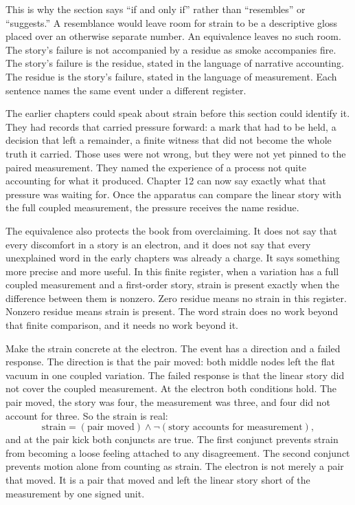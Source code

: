 This is why the section says ``if and only if'' rather than ``resembles'' or
``suggests.'' A resemblance would leave room for strain to be a descriptive
gloss placed over an otherwise separate number. An equivalence leaves no such
room. The story's failure is not accompanied by a residue as smoke accompanies
fire. The story's failure is the residue, stated in the language of narrative
accounting. The residue is the story's failure, stated in the language of
measurement. Each sentence names the same event under a different register.

The earlier chapters could speak about strain before this section could identify
it. They had records that carried pressure forward: a mark that had to be held,
a decision that left a remainder, a finite witness that did not become the whole
truth it carried. Those uses were not wrong, but they were not yet pinned to the
paired measurement. They named the experience of a process not quite accounting
for what it produced. Chapter 12 can now say exactly what that pressure was
waiting for. Once the apparatus can compare the linear story with the full
coupled measurement, the pressure receives the name residue.

The equivalence also protects the book from overclaiming. It does not say that
every discomfort in a story is an electron, and it does not say that every
unexplained word in the early chapters was already a charge. It says something
more precise and more useful. In this finite register, when a variation has a
full coupled measurement and a first-order story, strain is present exactly when
the difference between them is nonzero. Zero residue means no strain in this
register. Nonzero residue means strain is present. The word strain does no work
beyond that finite comparison, and it needs no work beyond it.

Make the strain concrete at the electron. The event has a direction and a
failed response. The direction is that the pair moved: both middle nodes left
the flat vacuum in one coupled variation. The failed response is that the linear
story did not cover the coupled measurement. At the electron both conditions
hold. The pair moved, the story was four, the measurement was three, and four
did not account for three. So the strain is real:
\[
  \text{strain} = (\text{pair moved}) \wedge \neg(\text{story accounts for measurement}),
\]
and at the pair kick both conjuncts are true. The first conjunct prevents strain
from becoming a loose feeling attached to any disagreement. The second conjunct
prevents motion alone from counting as strain. The electron is not merely a
pair that moved. It is a pair that moved and left the linear story short of the
measurement by one signed unit.

